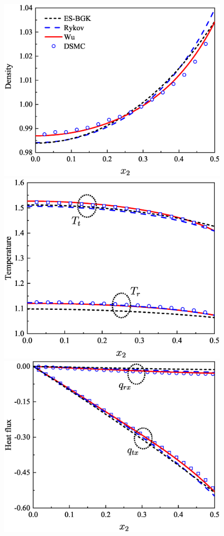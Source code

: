 \begin{figure}[t]
	\vskip 0.5cm
	{\includegraphics[scale=0.25,clip=true]{Fig/04CF4.eps}}\quad
	{\includegraphics[scale=0.25,clip=true]{Fig/04CF5.eps}}\quad
	{\includegraphics[scale=0.25,clip=true]{Fig/04CF6.eps}}

\end{figure}
